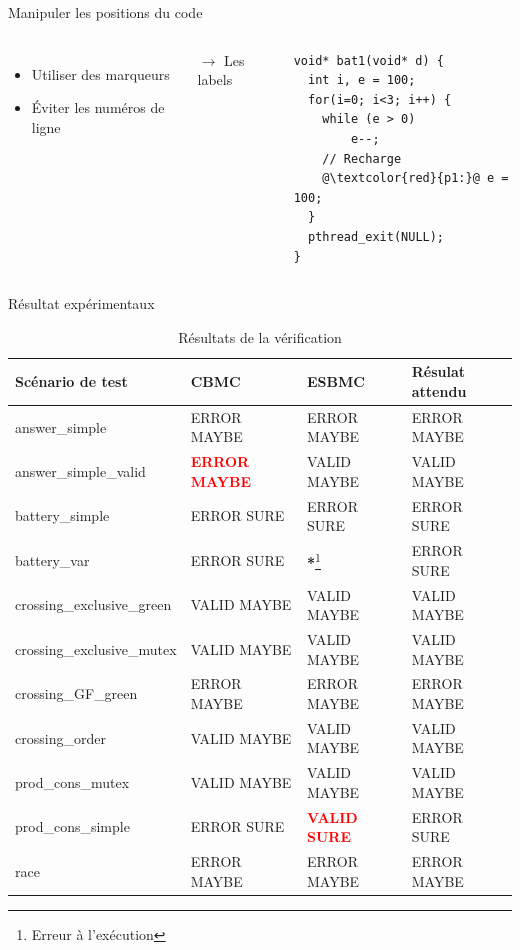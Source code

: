 \documentclass{beamer}
\begin{document}
\begin{frame}[fragile]{Manipuler les positions du code}
\begin{columns}[onlytextwidth, c]
  \begin{itemize}
    \setlength{\itemsep}{1.5em}
    \item Utiliser des marqueurs
    \item \alert{Éviter les numéros de ligne}
  \end{itemize}

  \vspace{5em}
  $\rightarrow$ Les labels

\begin{lstlisting}
void* bat1(void* d) {
  int i, e = 100;
  for(i=0; i<3; i++) {
    while (e > 0)
        e--;
    // Recharge
    @\textcolor{red}{p1:}@ e = 100;
  }
  pthread_exit(NULL);
}
\end{lstlisting}
\end{columns}
\end{frame}

\begin{frame}{Résultat expérimentaux}
\begin{table}[tbp]
  \scriptsize
  \centering
\label{tbl:resultats}
\caption{Résultats de la vérification}
\begin{tabular}{|l|l|l|l|}
\hline
Scénario de test           & CBMC                 & ESBMC            & Résulat attendu \\
\hline
answer\_simple             & ERROR MAYBE          & ERROR MAYBE      & ERROR MAYBE     \\
\rowcolor{light-gray}
  answer\_simple\_valid      & \textcolor{red}{\textbf{ERROR MAYBE}} & VALID MAYBE      & VALID MAYBE     \\
battery\_simple            & ERROR SURE           & ERROR SURE       & ERROR SURE      \\
\rowcolor{light-gray}
battery\_var               & ERROR SURE           & \textbf{*}\footnote{Erreur à l'exécution}& ERROR SURE      \\
crossing\_exclusive\_green & VALID MAYBE          & VALID MAYBE      & VALID MAYBE     \\
crossing\_exclusive\_mutex & VALID MAYBE          & VALID MAYBE      & VALID MAYBE     \\
crossing\_GF\_green        & ERROR MAYBE          & ERROR MAYBE      & ERROR MAYBE     \\
crossing\_order            & VALID MAYBE          & VALID MAYBE      & VALID MAYBE     \\
prod\_cons\_mutex          & VALID MAYBE          & VALID MAYBE      & VALID MAYBE     \\
\rowcolor{light-gray}
  prod\_cons\_simple         & ERROR SURE           & \textcolor{red}{\textbf{VALID SURE}} & ERROR SURE      \\
race                       & ERROR MAYBE          & ERROR MAYBE      & ERROR MAYBE     \\
\hline
\end{tabular}
\end{table}
\end{frame}
\end{document}
